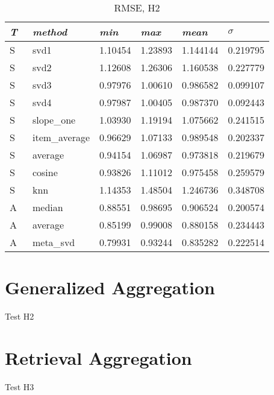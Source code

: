 \begin{table}
  \begin{tabular*}{\textwidth}{ l p{3cm} p{2cm} p{2cm} p{2cm} p{2cm} }
    \toprule
      \emph{T} & \emph{method} & 
      \emph{min} & \emph{max} & \emph{mean} & $\sigma$\\
    \midrule
    S & svd1          & 1.10454	& 1.23893	& 1.144144	& 0.219795 \\
    S & svd2          & 1.12608	& 1.26306	& 1.160538	& 0.227779 \\
    S & svd3          & 0.97976	& 1.00610	& 0.986582	& 0.099107 \\
    S & svd4          & 0.97987	& 1.00405	& 0.987370	& 0.092443 \\
    S & slope\_one    & 1.03930	& 1.19194	& 1.075662	& 0.241515 \\
    S & item\_average & 0.96629	& 1.07133	& 0.989548	& 0.202337 \\
    S & average       & 0.94154	& 1.06987	& 0.973818	& 0.219679 \\
    S & cosine   	    & 0.93826	& 1.11012	& 0.975458	& 0.259579 \\
    S & knn       	  & 1.14353	& 1.48504	& 1.246736	& 0.348708 \\
    \midrule            
    A & median    	  & 0.88551	& 0.98695	& 0.906524	& 0.200574 \\
    A & average    	  & 0.85199	& 0.99008	& 0.880158	& 0.234443 \\
    A & meta\_svd     & 0.79931	& 0.93244	& 0.835282	& 0.222514 \\
    \bottomrule
  \end{tabular*}
  \caption[Results]{RMSE, H2}
  \label{table:results:h2:sum}
\end{table}




\section{Generalized Aggregation}

Test H2


\section{Retrieval Aggregation}

Test H3




